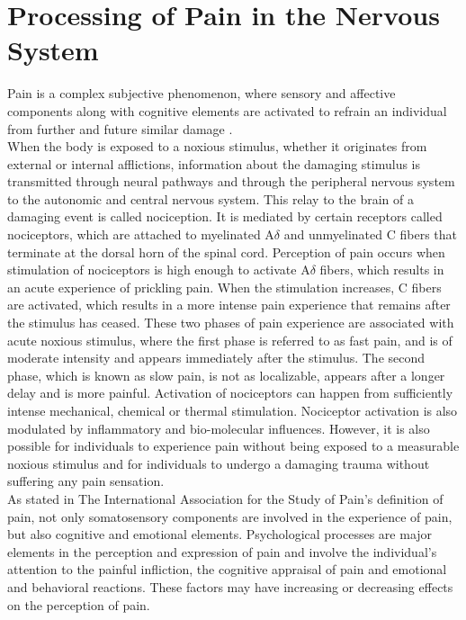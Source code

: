\section{Processing of Pain in the Nervous System} \label{sec:pain}

Pain is a complex subjective phenomenon, where sensory and affective components along with cognitive elements are activated to refrain an individual from further and future similar damage \cite{Davis2017}. \\
When the body is exposed to a noxious stimulus, whether it originates from external or internal afflictions, information about the damaging stimulus is transmitted through neural pathways and through the peripheral nervous system to the autonomic and central nervous system. This relay to the brain of a damaging event is called nociception. It is mediated by certain receptors called nociceptors, which are attached to myelinated A$\delta$ and unmyelinated C fibers that terminate at the dorsal horn of the spinal cord. Perception of pain occurs when stimulation of nociceptors is high enough to activate A$\delta$ fibers, which results in an acute experience of prickling pain. When the stimulation increases, C fibers are activated, which results in a more intense pain experience that remains after the stimulus has ceased. These two phases of pain experience are associated with acute noxious stimulus, where the first phase is referred to as fast pain, and is of moderate intensity and appears immediately after the stimulus. The second phase, which is known as slow pain, is not as localizable, appears after a longer delay and is more painful. Activation of nociceptors can happen from sufficiently intense mechanical, chemical or thermal stimulation. Nociceptor activation is also modulated by inflammatory and bio-molecular influences. However, it is also possible for individuals to experience pain without being exposed to a measurable noxious stimulus and for individuals to undergo a damaging trauma without suffering any pain sensation. \cite{Garland2013} \\ 
As stated in The International Association for the Study of Pain’s definition of pain, not only somatosensory components are involved in the experience of pain, but also cognitive and emotional elements. Psychological processes are major elements in the perception and expression of pain and involve the individual’s attention to the painful infliction, the cognitive appraisal of pain and emotional and behavioral reactions. These factors may have increasing or decreasing effects on the perception of pain. \\
